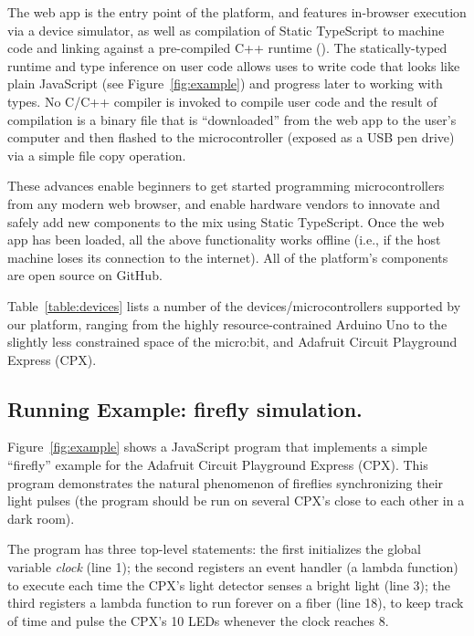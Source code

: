 The \MC web app is the entry point of the platform, and features
in-browser execution via a device simulator,
as well as compilation of Static TypeScript to machine code and linking against a pre-compiled C++ runtime (\emph{\CON}).
The statically-typed runtime and type inference on user code allows uses to write code
that looks like plain JavaScript (see Figure~\ref{fig:example}) and progress later to working
with types.
No C/C++ compiler is invoked to compile user code and the result of compilation is a
binary file that is ``downloaded'' from the web app to the user's
computer and then flashed to the microcontroller (exposed as a USB pen drive)
via a simple file copy operation.

These advances enable beginners to get started programming microcontrollers from
any modern web browser, and enable hardware vendors to innovate and safely add new
components to the mix using Static TypeScript.
Once the web app has been loaded, all the above functionality works offline
(i.e., if the host machine loses its connection
to the internet). All of the platform's components are open source on GitHub.


Table~\ref{table:devices} lists a number of the devices/microcontrollers supported by our platform,
ranging from the highly resource-contrained Arduino Uno to the slightly less constrained space of
the micro:bit, and Adafruit Circuit Playground Express (CPX).

\subsection{Running Example: firefly simulation.}

Figure~\ref{fig:example} shows a JavaScript
program that implements a simple ``firefly'' example
for the Adafruit Circuit Playground Express (CPX).
This program demonstrates the natural phenomenon
of fireflies synchronizing their light pulses (the program should be
run on several CPX's close to each other in a dark room).

The program has three top-level statements:
the first initializes the global variable \emph{clock} (line 1); the
second registers an event handler (a lambda function) to execute
each time the CPX's light detector senses a bright light (line 3); the
third registers a lambda function to run forever on a fiber (line 18),
to keep track of time and pulse the CPX's 10 LEDs whenever the
clock reaches 8.

